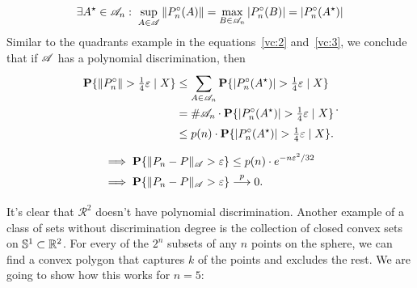 \[\exists A^\star \in \AA_n:\; \sup_{A\in \AA} \|P_n^\circ (A)\| = \max_{B\in \AA_n} | P_n^\circ(B) | = | {P_n^\circ(A^\star )}|  \] 
Similar to the quadrants example in the equations~\ref{vc:2} and~\ref{vc:3}, we conclude that if $\AA$ has a polynomial discrimination, then
\begin{equation}\label{vc:5}
    \everymath{\displaystyle}\arraycolsep=1.4pt\def\arraystretch{1.5}
    \begin{array}{rcl}
    \P\{ \|P_n^\circ\| > \tfrac{1}{4} \varepsilon \;|\; X \} & \leq & \sum_{A\in\AA_n}\P\{ |P_n^\circ(A^\star)| > \tfrac{1}{4} \varepsilon \;|\; X \}\\
    & = & \# \AA_n \cdot\P\{ |P_n^\circ(A^\star)| > \tfrac{1}{4} \varepsilon \;|\; X \}\\
    & \leq & p(n) \cdot \P\{ |P_n^\circ(A^\star)| > \tfrac{1}{4} \varepsilon \;|\; X \} .
  \end{array}.
\end{equation}
\begin{equation}\label{vc:6}
     \everymath{\displaystyle}\arraycolsep=1.4pt\def\arraystretch{1.5}
     \begin{array}{rl}
        \implies & \P\{\|P_n-P\|_{\AA} > \varepsilon\} \leq p(n) \cdot e^{-n \varepsilon^2 / 32}\\
        \implies & \P\{\|P_n-P\|_\AA > \varepsilon\} \overset{p}{\longrightarrow} 0.
    \end{array}
\end{equation}

\vspace*{1em}

It's clear that $\mathcal{R}^2$ doesn't have polynomial discrimination. Another example of a class of sets without discrimination degree is the collection of closed convex sets on $\S^1 \subset \R^2$. For every of the $2^n$ subsets of any $n$ points on the sphere, we can find a convex polygon that captures $k$ of the points and excludes the rest. We are going to show how this works for $n = 5$: 


